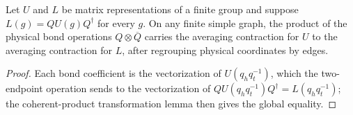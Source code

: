 \begin{lemma}%
    \label{thm:peps_graph_bond_coordinate_transport}
    \leanok
    Let $U$ and $L$ be matrix representations of a finite group and suppose
    $L(g)=QU(g)Q^\dagger$ for every $g$. On any finite simple graph, the
    product of the physical bond operations $Q\otimes\overline Q$ carries
    the averaging contraction for $U$ to the averaging
    contraction for $L$, after regrouping physical coordinates by edges.
\end{lemma}
\begin{proof}\leanok
    Each bond coefficient is the vectorization of
    $U(q_hq_t^{-1})$, which the two-endpoint operation sends to the
    vectorization of $QU(q_hq_t^{-1})Q^\dagger=L(q_hq_t^{-1})$;
    the coherent-product transformation lemma then gives the global equality.
\end{proof}

